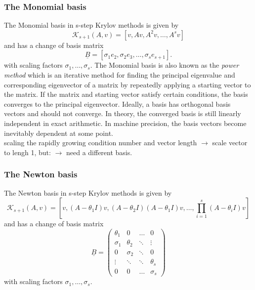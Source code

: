 \documentclass{scrartcl}
\begin{document}
\subsubsection{The Monomial basis}
The Monomial basis in s-step Krylov methods is given by 
\begin{equation*}
\mathcal{K}_{s + 1}(A, v) = [v, Av, A^2v, \ldots, A^sv]
\end{equation*}
and has a change of basis matrix
\begin{equation*}
\underline{B} = [\sigma_1 e_2, \sigma_2 e_3, \ldots, \sigma_s e_{s + 1}].
\end{equation*}
with scaling factors $\sigma_1, \ldots, \sigma_s$.
The Monomial basis is also known as the \textit{power method} which is an iterative method for finding the principal eigenvalue and corresponding eigenvector of a matrix by repeatedly applying a starting vector to the matrix. If the matrix and starting vector satisfy certain conditions, the basis converges to the principal eigenvector. Ideally, a basis has orthogonal basis vectors and should not converge. In theory, the converged basis is still linearly independent in exact arithmetic. In machine precision, the basis vectors become inevitably dependent at some point. \\

scaling the rapidly growing condition number and vector length $\rightarrow$ scale vector to lengh 1, but:  $\rightarrow$ need a different basis.
\subsubsection{The Newton basis}
The Newton basis in s-step Krylov methods is given by 
\begin{equation*}
\mathcal{K}_{s + 1}(A, v) = \left[v, (A - \theta_1 I )v, (A - \theta_2 I )(A - \theta_1 I )v, \ldots, \displaystyle\prod_{i = 1}^s (A - \theta_i I )v\right]
\end{equation*}
and has a change of basis matrix
\begin{equation*}
\underline{B} = 
\begin{pmatrix}
\theta_1 & 0 & \ldots & 0 \\
\sigma_1 & \theta_2 & \ddots & \vdots \\
0 & \sigma_2 & \ddots & 0 \\
\vdots & \ddots & \ddots & \theta_s \\
0 & 0 & \ldots & \sigma_s 
\end{pmatrix}
\end{equation*}
with scaling factors $\sigma_1, \ldots, \sigma_s$.\\
\end{document}
